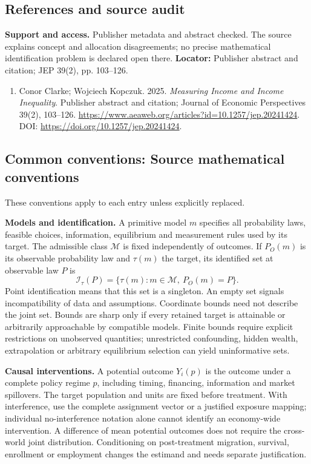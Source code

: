 \documentclass[11pt,a4paper]{article}
\begin{document}
\subsection*{References and source audit}
\textbf{Support and access.} Publisher metadata and abstract checked. The source explains concept and allocation disagreements; no precise mathematical identification problem is declared open there. \textbf{Locator:} Publisher abstract and citation; JEP 39(2), pp. 103--126.
\begin{enumerate}\raggedright
\item\hypertarget{definitions:source:30007642:1}{} Conor Clarke; Wojciech Kopczuk. 2025. \emph{Measuring Income and Income Inequality}. Publisher abstract and citation; Journal of Economic Perspectives 39(2), 103--126.
\url{https://www.aeaweb.org/articles?id=10.1257/jep.20241424}.
DOI: \url{https://doi.org/10.1257/jep.20241424}.
\end{enumerate}

\subsection*{Common conventions: Source mathematical conventions}

These conventions apply to each entry unless explicitly replaced.

\textbf{Models and identification.} A primitive model \(m\) specifies all probability laws, feasible choices, information, equilibrium and measurement rules used by its target. The admissible class \(\mathcal M\) is fixed independently of outcomes. If \(P_O(m)\) is its observable probability law and \(\tau(m)\) the target, its identified set at observable law \(P\) is
\[
 \mathcal I_\tau(P)=\{\tau(m):m\in\mathcal M,\ P_O(m)=P\}.
\]
Point identification means that this set is a singleton. An empty set signals incompatibility of data and assumptions. Coordinate bounds need not describe the joint set. Bounds are sharp only if every retained target is attainable or arbitrarily approachable by compatible models. Finite bounds require explicit restrictions on unobserved quantities; unrestricted confounding, hidden wealth, extrapolation or arbitrary equilibrium selection can yield uninformative sets.

\textbf{Causal interventions.} A potential outcome \(Y_i(p)\) is the outcome under a complete policy regime \(p\), including timing, financing, information and market spillovers. The target population and units are fixed before treatment. With interference, use the complete assignment vector or a justified exposure mapping; individual no-interference notation alone cannot identify an economy-wide intervention. A difference of mean potential outcomes does not require the cross-world joint distribution. Conditioning on post-treatment migration, survival, enrollment or employment changes the estimand and needs separate justification.
\end{document}
